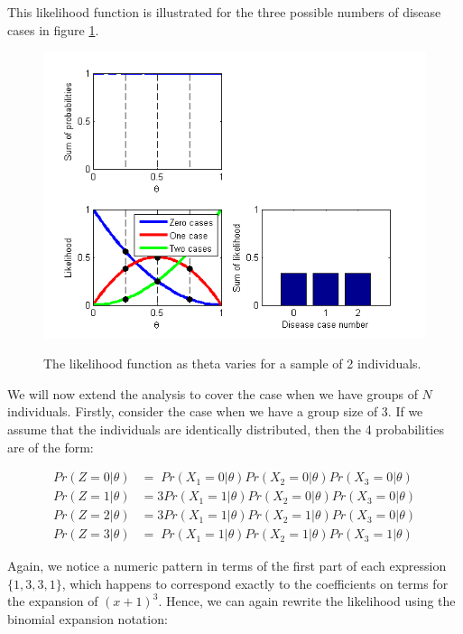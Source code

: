 \documentclass[11pt,fullpage]{book}
\begin{document}
This likelihood function is illustrated for the three possible numbers of disease cases in figure \ref{fig:Likelihood_binomial}.

\begin{figure}
\centering
\scalebox{0.75} 
{\includegraphics{likelihood_binomial.png}}
\caption{The likelihood function as theta varies for a sample of 2 individuals.}\label{fig:Likelihood_binomial}
\end{figure}

We will now extend the analysis to cover the case when we have groups of $N$ individuals. Firstly, consider the case when we have a group size of 3. If we assume that the individuals are identically distributed, then the 4 probabilities are of the form:

\begin{align}\label{eq:Likelihood_binomialThreeProbsSimpler}
Pr(Z = 0|\theta)& = \;Pr(X_1=0|\theta) Pr(X_2=0|\theta)  Pr(X_3=0|\theta)\\
Pr(Z = 1|\theta)& = 3Pr(X_1=1|\theta) Pr(X_2=0|\theta)  Pr(X_3=0|\theta)\\
Pr(Z = 2|\theta)& = 3Pr(X_1=1|\theta) Pr(X_2=1|\theta)  Pr(X_3=0|\theta)\\
Pr(Z = 3|\theta)& = \;Pr(X_1=1|\theta)Pr(X_2=1|\theta) Pr(X_3=1|\theta)
\end{align}

Again, we notice a numeric pattern in terms of the first part of each expression $\{1,3,3,1\}$, which happens to correspond exactly to the coefficients on terms for the expansion of $(x+1)^3$. Hence, we can again rewrite the likelihood using the binomial expansion notation:
\end{document}
